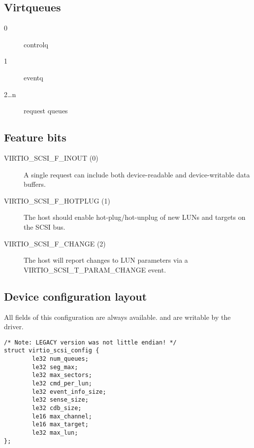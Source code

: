 \subsection{Virtqueues}\label{sec:Device Types / SCSI Host Device / Virtqueues}

\begin{description}
\item[0] controlq
\item[1] eventq
\item[2\ldots n] request queues
\end{description}

\subsection{Feature bits}\label{sec:Device Types / SCSI Host Device / Feature bits}

\begin{description}
\item[VIRTIO_SCSI_F_INOUT (0)] A single request can include both
    device-readable and device-writable data buffers.

\item[VIRTIO_SCSI_F_HOTPLUG (1)] The host should enable
    hot-plug/hot-unplug of new LUNs and targets on the SCSI bus.

\item[VIRTIO_SCSI_F_CHANGE (2)] The host will report changes to LUN
    parameters via a VIRTIO_SCSI_T_PARAM_CHANGE event.
\end{description}

\subsection{Device configuration layout}\label{sec:Device Types / SCSI Host Device / Device configuration layout}

  All fields of this configuration are always available. 
  and  are writable by the driver.

\begin{lstlisting}
/* Note: LEGACY version was not little endian! */
struct virtio_scsi_config {
        le32 num_queues;
        le32 seg_max;
        le32 max_sectors;
        le32 cmd_per_lun;
        le32 event_info_size;
        le32 sense_size;
        le32 cdb_size;
        le16 max_channel;
        le16 max_target;
        le32 max_lun;
};
\end{lstlisting}

